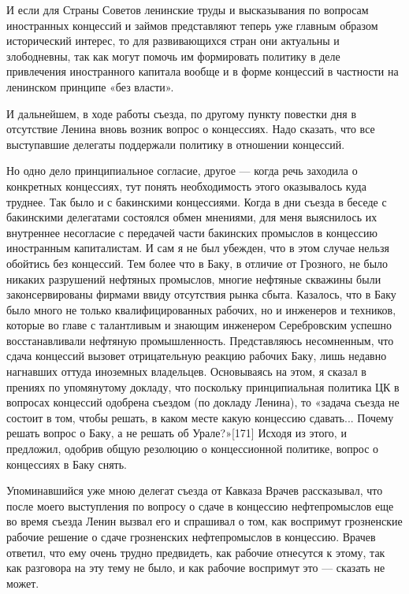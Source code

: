 \documentclass[12pt, a4paper, openany]{book}
\begin{document}
И если для Страны Советов ленинские труды и высказывания по вопросам иностранных концессий и займов представляют теперь уже главным образом исторический интерес, то для развивающихся стран они актуальны и злободневны, так как могут помочь им формировать политику в деле привлечения иностранного капитала вообще и в форме концессий в частности на ленинском принципе «без власти».

И дальнейшем, в ходе работы съезда, по другому пункту повестки дня в отсутствие Ленина вновь возник вопрос о концессиях. Надо сказать, что все выступавшие делегаты поддержали политику в отношении концессий.

Но одно дело принципиальное согласие, другое — когда речь заходила о конкретных концессиях, тут понять необходимость этого оказывалось куда труднее. Так было и с бакинскими концессиями. Когда в дни съезда в беседе с бакинскими делегатами состоялся обмен мнениями, для меня выяснилось их внутреннее несогласие с передачей части бакинских промыслов в концессию иностранным капиталистам. И сам я не был убежден, что в этом случае нельзя обойтись без концессий. Тем более что в Баку, в отличие от Грозного, не было никаких разрушений нефтяных промыслов, многие нефтяные скважины были законсервированы фирмами ввиду отсутствия рынка сбыта. Казалось, что в Баку было много не только квалифицированных рабочих, но и инженеров и техников, которые во главе с талантливым и знающим инженером Серебровским успешно восстанавливали нефтяную промышленность. Представляюсь несомненным, что сдача концессий вызовет отрицательную реакцию рабочих Баку, лишь недавно нагнавших оттуда иноземных владельцев. Основываясь на этом, я сказал в прениях по упомянутому докладу, что поскольку принципиальная политика ЦК в вопросах концессий одобрена съездом (по докладу Ленина), то «задача съезда не состоит в том, чтобы решать, в каком месте какую концессию сдавать... Почему решать вопрос о Баку, а не решать об Урале?»[171] Исходя из этого, и предложил, одобрив общую резолюцию о концессионной политике, вопрос о концессиях в Баку снять.

Упоминавшийся уже мною делегат съезда от Кавказа Врачев рассказывал, что после моего выступления по вопросу о сдаче в концессию нефтепромыслов еще во время съезда Ленин вызвал его и спрашивал о том, как воспримут грозненские рабочие решение о сдаче грозненских нефтепромыслов в концессию. Врачев ответил, что ему очень трудно предвидеть, как рабочие отнесутся к этому, так как разговора на эту тему не было, и как рабочие воспримут это — сказать не может.
\end{document}
